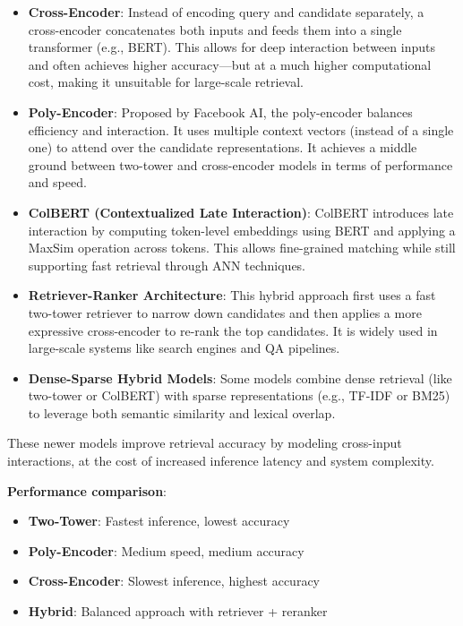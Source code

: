 \begin{itemize}
	\item \textbf{Cross-Encoder}: Instead of encoding query and candidate separately, a cross-encoder concatenates both inputs and feeds them into a single transformer (e.g., BERT). This allows for deep interaction between inputs and often achieves higher accuracy—but at a much higher computational cost, making it unsuitable for large-scale retrieval.

	\item \textbf{Poly-Encoder}: Proposed by Facebook AI, the poly-encoder balances efficiency and interaction. It uses multiple context vectors (instead of a single one) to attend over the candidate representations. It achieves a middle ground between two-tower and cross-encoder models in terms of performance and speed.

	\item \textbf{ColBERT (Contextualized Late Interaction)}: ColBERT introduces late interaction by computing token-level embeddings using BERT and applying a MaxSim operation across tokens. This allows fine-grained matching while still supporting fast retrieval through ANN techniques.

	\item \textbf{Retriever-Ranker Architecture}: This hybrid approach first uses a fast two-tower retriever to narrow down candidates and then applies a more expressive cross-encoder to re-rank the top candidates. It is widely used in large-scale systems like search engines and QA pipelines.

	\item \textbf{Dense-Sparse Hybrid Models}: Some models combine dense retrieval (like two-tower or ColBERT) with sparse representations (e.g., TF-IDF or BM25) to leverage both semantic similarity and lexical overlap.
\end{itemize}

These newer models improve retrieval accuracy by modeling cross-input interactions, at the cost of increased inference latency and system complexity.

\textbf{Performance comparison}:
\begin{itemize}
	\item \textbf{Two-Tower}: Fastest inference, lowest accuracy
	\item \textbf{Poly-Encoder}: Medium speed, medium accuracy
	\item \textbf{Cross-Encoder}: Slowest inference, highest accuracy
	\item \textbf{Hybrid}: Balanced approach with retriever + reranker
\end{itemize}

